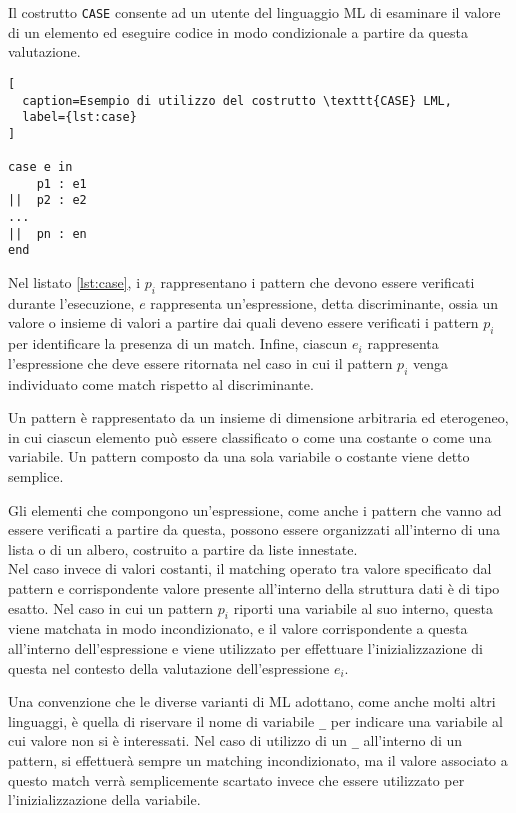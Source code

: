 Il costrutto \texttt{CASE} consente ad un utente del linguaggio ML di esaminare
il valore di un elemento ed eseguire codice in modo condizionale a partire da
questa valutazione.

\begin{lstlisting}[
  caption=Esempio di utilizzo del costrutto \texttt{CASE} LML,
  label={lst:case}
]

case e in
    p1 : e1
||  p2 : e2
...
||  pn : en
end

\end{lstlisting}

Nel listato \ref{lst:case}, i $p_i$ rappresentano i pattern che devono essere
verificati durante l'esecuzione, $e$ rappresenta un’espressione, detta
discriminante, ossia un valore o insieme di valori a partire dai quali deveno
essere verificati i pattern $p_i$ per identificare la presenza di un match.
Infine, ciascun $e_i$ rappresenta l'espressione che deve essere ritornata nel
caso in cui il pattern $p_i$ venga individuato come match rispetto al
discriminante.

Un pattern è rappresentato da un insieme di dimensione arbitraria ed eterogeneo,
in cui ciascun elemento può essere classificato o come una costante o come una
variabile. Un pattern composto da una sola variabile o costante viene detto
semplice.

Gli elementi che compongono un'espressione, come anche i pattern che vanno ad
essere verificati a partire da questa, possono essere organizzati all’interno di
una lista o di un albero, costruito a partire da liste innestate.\\

Nel caso invece di valori costanti, il matching operato tra valore specificato
dal pattern e corrispondente valore presente all'interno della struttura dati è
di tipo esatto. Nel caso in cui un pattern $p_i$ riporti una variabile al suo
interno, questa viene matchata in modo incondizionato, e il valore
corrispondente a questa all’interno dell’espressione e viene utilizzato per
effettuare l’inizializzazione di questa nel contesto della valutazione
dell'espressione $e_i$.

Una convenzione che le diverse varianti di ML adottano, come anche molti altri
linguaggi, è quella di riservare il nome di variabile \texttt{\_} per indicare
una variabile al cui valore non si è interessati. Nel caso di utilizzo di un
\texttt{\_} all’interno di un pattern, si effettuerà sempre un matching
incondizionato, ma il valore associato a questo match verrà semplicemente
scartato invece che essere utilizzato per l’inizializzazione della variabile.

